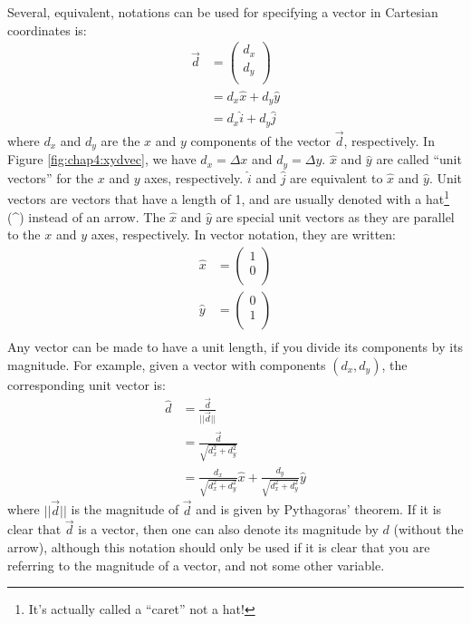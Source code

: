 Several, equivalent, notations can be used for specifying a vector in Cartesian coordinates is:
\begin{align*}
\vec d &= \begin{pmatrix}
           d_x \\
           d_y \\
         \end{pmatrix}\\
         &= d_x\hat x +d_y \hat y\\
         &=d_x\hat i +d_y \hat j
\end{align*}
where $d_x$ and $d_y$ are the $x$ and $y$ components of the vector $\vec d$, respectively. In Figure \ref{fig:chap4:xydvec}, we have $d_x=\Delta x$ and $d_y=\Delta y$. $\hat x$ and $\hat y$ are called ``unit vectors'' for the $x$ and $y$ axes, respectively. $\hat i$ and $\hat j$ are equivalent to $\hat x$ and $\hat y$.  Unit vectors are vectors that have a length of 1, and are usually denoted with a hat\footnote{It's actually called a ``caret'' not a hat!} (\^{}) instead of an arrow. The $\hat x$ and $\hat y$ are special unit vectors as they are parallel to the $x$ and $y$ axes, respectively. In vector notation, they are written:
\begin{align*}
\hat x &= \begin{pmatrix}
           1\\
           0 \\
         \end{pmatrix}\\
\hat y &= \begin{pmatrix}
           0\\
           1 \\
         \end{pmatrix}\\       
\end{align*}
Any vector can be made to have a unit length, if you divide its components by its magnitude. For example, given a vector with components $(d_x,d_y)$, the corresponding unit vector is:
\begin{align*}
\hat d &= \frac{\vec d}{||\vec d||}\\
       &= \frac{\vec d}{\sqrt{d_x^2+d_y^2}}\\
       &= \frac{d_x}{\sqrt{d_x^2+d_y^2}}\hat x+\frac{d_y}{\sqrt{d_x^2+d_y^2}}\hat y
\end{align*}
where $||\vec d||$ is the magnitude of $\vec d$ and is given by Pythagoras' theorem. If it is clear that $\vec d$ is a vector, then one can also denote its magnitude by $d$ (without the arrow), although this notation should only be used if it is clear that you are referring to the magnitude of a vector, and not some other variable.

